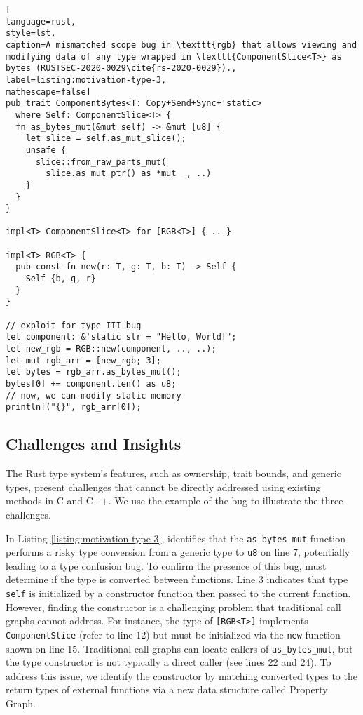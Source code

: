 \begin{lstlisting}[
language=rust, 
style=lst,
caption=A mismatched scope bug in \texttt{rgb} that allows viewing and modifying data of any type wrapped in \texttt{ComponentSlice<T>} as bytes (RUSTSEC-2020-0029\cite{rs-2020-0029}).,
label=listing:motivation-type-3,
mathescape=false]
pub trait ComponentBytes<T: Copy+Send+Sync+'static>
  where Self: ComponentSlice<T> {
  fn as_bytes_mut(&mut self) -> &mut [u8] {
    let slice = self.as_mut_slice();
    unsafe {
      slice::from_raw_parts_mut(
        slice.as_mut_ptr() as *mut _, ..)
    }
  }
}

impl<T> ComponentSlice<T> for [RGB<T>] { .. }

impl<T> RGB<T> {
  pub const fn new(r: T, g: T, b: T) -> Self {
    Self {b, g, r}
  }
}

// exploit for type III bug
let component: &'static str = "Hello, World!";
let new_rgb = RGB::new(component, .., ..);
let mut rgb_arr = [new_rgb; 3];
let bytes = rgb_arr.as_bytes_mut();
bytes[0] += component.len() as u8;
// now, we can modify static memory
println!("{}", rgb_arr[0]);
\end{lstlisting}





\subsection{Challenges and Insights}
\label{sec:challenge}
The Rust type system's features, such as ownership, trait bounds, and generic types, present challenges that cannot be directly addressed using existing methods in C and C++. We use the example of the \bthree bug to illustrate the three challenges.

\vspace{0.05in}
 \label{motive:call-graph-construction}
{In Listing \ref{listing:motivation-type-3}, \TN identifies that the \texttt{as\_bytes\_mut} function performs a risky type conversion from a generic type to \texttt{u8} on line 7, potentially leading to a type confusion bug. To confirm the presence of this bug, \TN must determine if the type is converted between functions. Line 3 indicates that type \texttt{self} is initialized by a constructor function then passed to the current function. However, finding the constructor is a challenging problem that traditional call graphs cannot address. For instance, the type of \texttt{[RGB<T>]} implements \texttt{ComponentSlice} (refer to line 12) but must be initialized via the \texttt{new} function shown on line 15. Traditional call graphs can locate callers of \texttt{as\_bytes\_mut}, but the type constructor is not typically a direct caller (see lines 22 and 24). To address this issue, we identify the constructor by matching converted types to the return types of external functions via a new data structure called Property Graph}.














